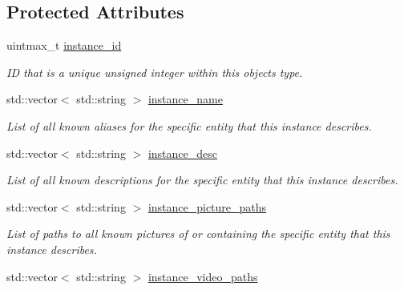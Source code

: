 \subsection*{Protected Attributes}
\begin{DoxyCompactItemize}
\item 
uintmax\+\_\+t \hyperlink{classsheila_1_1Entity_ad738ad7481e8575f577c821210ef95a5}{instance\+\_\+id}\hypertarget{classsheila_1_1Entity_ad738ad7481e8575f577c821210ef95a5}{}\label{classsheila_1_1Entity_ad738ad7481e8575f577c821210ef95a5}

\begin{DoxyCompactList}\small\item\em ID that is a unique unsigned integer within this object\textquotesingle{}s type. \end{DoxyCompactList}\item 
std\+::vector$<$ std\+::string $>$ \hyperlink{classsheila_1_1Entity_a781fe33d036a80709be80f34cd86a9b7}{instance\+\_\+name}\hypertarget{classsheila_1_1Entity_a781fe33d036a80709be80f34cd86a9b7}{}\label{classsheila_1_1Entity_a781fe33d036a80709be80f34cd86a9b7}

\begin{DoxyCompactList}\small\item\em List of all known aliases for the specific entity that this instance describes. \end{DoxyCompactList}\item 
std\+::vector$<$ std\+::string $>$ \hyperlink{classsheila_1_1Entity_a0befe31660d8a868d3ba435ede58b6e2}{instance\+\_\+desc}\hypertarget{classsheila_1_1Entity_a0befe31660d8a868d3ba435ede58b6e2}{}\label{classsheila_1_1Entity_a0befe31660d8a868d3ba435ede58b6e2}

\begin{DoxyCompactList}\small\item\em List of all known descriptions for the specific entity that this instance describes. \end{DoxyCompactList}\item 
std\+::vector$<$ std\+::string $>$ \hyperlink{classsheila_1_1Entity_a97a26ae1c5a05bbfc4d76e4f8beb67e5}{instance\+\_\+picture\+\_\+paths}\hypertarget{classsheila_1_1Entity_a97a26ae1c5a05bbfc4d76e4f8beb67e5}{}\label{classsheila_1_1Entity_a97a26ae1c5a05bbfc4d76e4f8beb67e5}

\begin{DoxyCompactList}\small\item\em List of paths to all known pictures of or containing the specific entity that this instance describes. \end{DoxyCompactList}\item 
std\+::vector$<$ std\+::string $>$ \hyperlink{classsheila_1_1Entity_a2285a01f1919bb408118991340b8865e}{instance\+\_\+video\+\_\+paths}\hypertarget{classsheila_1_1Entity_a2285a01f1919bb408118991340b8865e}{}\label{classsheila_1_1Entity_a2285a01f1919bb408118991340b8865e}


\end{DoxyCompactItemize}
